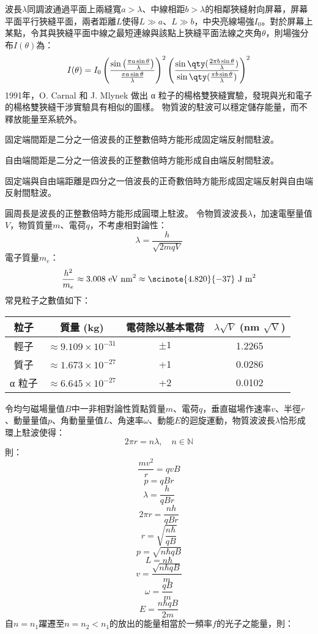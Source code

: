 \documentclass[a4paper,12pt]{article}
\begin{document}
波長$\lambda$同調波通過平面上兩縫寬$a>\lambda$、中線相距$b>\lambda$的相鄰狹縫射向屏幕，屏幕平面平行狹縫平面，兩者距離$L$使得$L\gg a$、$L\gg b$，中央亮線場強$I_0$。對於屏幕上某點，令其與狹縫平面中線之最短連線與該點上狹縫平面法線之夾角$\theta$，則場強分布$I(\theta)$為：
\[I(\theta) = I_0\left( \frac{\sin \left( \frac{\pi a \sin\theta}{\lambda} \right)}{\frac{\pi a \sin\theta}{\lambda}} \right)^2\left(\frac{\sin\qty(\frac{2\pi b\sin\theta}{\lambda})}{\sin\qty(\frac{\pi b\sin\theta}{\lambda})}\right)^2\]
1991年，O. Carnal 和 J. Mlynek 做出 α 粒子的楊格雙狹縫實驗，發現與光和電子的楊格雙狹縫干涉實驗具有相似的圖樣。
物質波的駐波可以穩定儲存能量，而不釋放能量至系統外。
\bit
\item 固定端間距是二分之一倍波長的正整數倍時方能形成固定端反射間駐波。
\item 自由端間距是二分之一倍波長的正整數倍時方能形成自由端反射間駐波。
\item 固定端與自由端距離是四分之一倍波長的正奇數倍時方能形成固定端反射與自由端反射間駐波。
\item 圓周長是波長的正整數倍時方能形成圓環上駐波。
\eit
{}
令物質波波長$\lambda$，加速電壓量值$V$，物質質量$m$、電荷$q$，不考慮相對論性：
\[\lambda=\frac{h}{\sqrt{2mqV}}\]
電子質量$m_e$：
\[\frac{h^2}{m_e}\approx3.008\text{\ eV\ nm}^2\approx\scinote{4.820}{-37}\text{\ J m}^2\]
常見粒子之數值如下：
\begin{longtable}[c]{|c|c|c|c|}
\hline
粒子 & 質量 (kg) & 電荷除以基本電荷 & $\lambda\sqrt{V}$ (nm $\sqrt{\text{V}}$)\\\hline\endhead
輕子 & \(\approx9.109 \times 10^{-31}\) & \(\pm1\) & 1.2265\\\hline
質子 & \(\approx1.673 \times 10^{-27}\) & +1 & 0.0286\\\hline
α 粒子 & \(\approx6.645 \times 10^{-27}\) & +2 & 0.0102\\\hline
\end{longtable}\FB
{}
令均勻磁場量值$B$中一非相對論性質點質量$m$、電荷$q$，垂直磁場作速率$v$、半徑$r$、動量量值$p$、角動量量值$L$、角速率$\omega$、動能$E$的迴旋運動，物質波波長$\lambda$恰形成環上駐波使得：
\[2\pi r=n\lambda,\quad n\in\mathbb{N}\]
則：
\[\frac{mv^2}{r}=qvB\]
\[p=qBr\]
\[\lambda=\frac{h}{qBr}\]
\[2\pi r=\frac{nh}{qBr}\]
\[r=\sqrt{\frac{n\hbar}{qB}}\]
\[p=\sqrt{n\hbar qB}\]
\[L=n\hbar\]
\[v=\frac{\sqrt{n\hbar qB}}{m}\]
\[\omega=\frac{qB}{m}\]
\[E=\frac{n\hbar qB}{2m}\]
自$n=n_1$躍遷至$n=n_2<n_1$的放出的能量相當於一頻率$f$的光子之能量，則：
\end{document}
